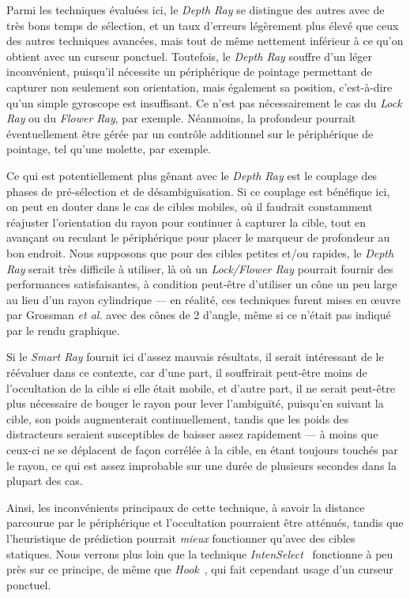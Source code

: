 	Parmi les techniques évaluées ici, le \emph{Depth Ray} se distingue des autres avec de très bons temps de sélection, et un taux d'erreurs légèrement plus élevé que ceux des autres techniques avancées, mais tout de même nettement inférieur à ce qu'on obtient avec un curseur ponctuel. Toutefois, le \emph{Depth Ray} souffre d'un léger inconvénient, puisqu'il nécessite un périphérique de pointage permettant de capturer non seulement son orientation, mais également sa position, c'est-à-dire qu'un simple gyroscope est insuffisant. Ce n'est pas nécessairement le cas du \emph{Lock Ray} ou du \emph{Flower Ray}, par exemple. Néanmoins, la profondeur pourrait éventuellement être gérée par un contrôle additionnel sur le périphérique de pointage, tel qu'une molette, par exemple.
	
	Ce qui est potentiellement plus gênant avec le \emph{Depth Ray} est le couplage des phases de pré-sélection et de désambiguïsation. Si ce couplage est bénéfique ici, on peut en douter dans le cas de cibles mobiles, où il faudrait constamment réajuster l'orientation du rayon pour continuer à \og capturer \fg{} la cible, tout en avançant ou reculant le périphérique pour placer le marqueur de profondeur au bon endroit. Nous supposons que pour des cibles petites et/ou rapides, le \emph{Depth Ray} serait très difficile à utiliser, là où un \emph{Lock/Flower Ray} pourrait fournir des performances satisfaisantes, à condition peut-être d'utiliser un cône un peu large au lieu d'un rayon cylindrique --- en réalité, ces techniques furent mises en \oe{}uvre par Grossman \emph{et al.} avec des cônes de 2\textdegree{} d'angle, même si ce n'était pas indiqué par le rendu graphique.
	
	Si le \emph{Smart Ray} fournit ici d'assez mauvais résultats, il serait intéressant de le réévaluer dans ce contexte, car d'une part, il souffrirait peut-être moins de l'occultation de la cible si elle était mobile, et d'autre part, il ne serait peut-être plus nécessaire de bouger le rayon pour lever l'ambiguïté, puisqu'en suivant la cible, son poids augmenterait continuellement, tandis que les poids des distracteurs seraient susceptibles de baisser assez rapidement --- à moins que ceux-ci ne se déplacent de façon corrélée à la cible, en étant toujours touchés par le rayon, ce qui est assez improbable sur une durée de plusieurs secondes dans la plupart des cas.
	
	Ainsi, les inconvénients principaux de cette technique, à savoir la distance parcourue par le périphérique et l'occultation pourraient être atténués, tandis que l'heuristique de prédiction pourrait \emph{mieux} fonctionner qu'avec des cibles statiques. Nous verrons plus loin que la technique \emph{IntenSelect}~\cite{de2005intenselect} fonctionne à peu près sur ce principe, de même que \emph{Hook}~\cite{ortega2013hook}, qui fait cependant usage d'un curseur ponctuel.
	
